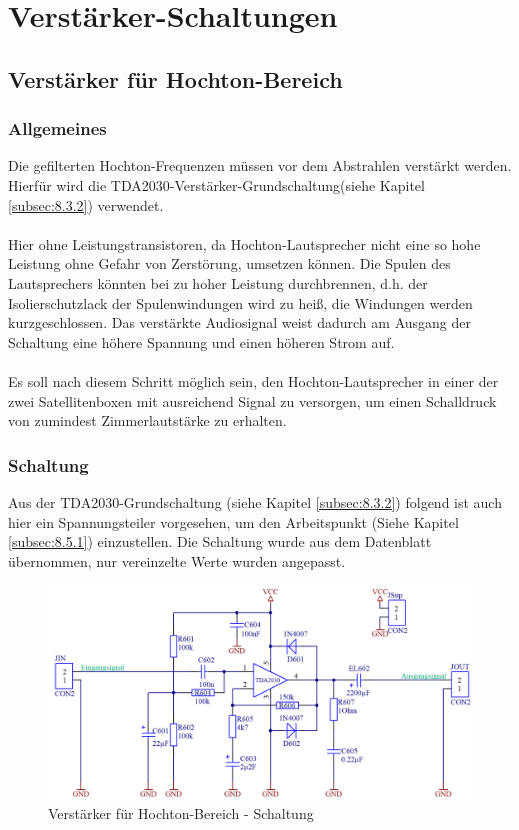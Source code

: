 
\section{Verstärker-Schaltungen}


\subsection{Verstärker für Hochton-Bereich}\label{subsec:5.1}
\subsubsection{Allgemeines}\label{subsec:5.1.1}
Die gefilterten Hochton-Frequenzen müssen vor dem Abstrahlen verstärkt werden.
Hierfür wird die TDA2030-Verstärker-Grundschaltung(siehe Kapitel \ref{subsec:8.3.2}) verwendet.
\\ \\
Hier ohne Leistungstransistoren, da Hochton-Lautsprecher nicht eine so hohe Leistung ohne Gefahr von Zerstörung, umsetzen können.
Die Spulen des Lautsprechers könnten bei zu hoher Leistung durchbrennen, d.h. der Isolierschutzlack der Spulenwindungen wird zu heiß, die Windungen werden kurzgeschlossen.
Das verstärkte Audiosignal weist dadurch am Ausgang der Schaltung eine höhere Spannung und einen höheren Strom auf.
\\ \\
Es soll nach diesem Schritt möglich sein, den Hochton-Lautsprecher in einer der zwei Satellitenboxen mit ausreichend Signal zu versorgen, um einen Schalldruck von zumindest Zimmerlautstärke zu erhalten. 

\newpage
\subsubsection{Schaltung}\label{subsec:5.1.2}
Aus der TDA2030-Grundschaltung (siehe Kapitel \ref{subsec:8.3.2}) folgend ist auch hier ein Spannungsteiler vorgesehen, um den Arbeitspunkt (Siehe Kapitel \ref{subsec:8.5.1}) einzustellen.
Die Schaltung wurde aus dem Datenblatt übernommen, nur vereinzelte Werte wurden angepasst. 

\begin{figure} [H]
	\centering	
	\includegraphics[width=1\textwidth]{img/Print6/HTVerstaerker-Schem.PNG}
	\caption{Verstärker für Hochton-Bereich - Schaltung}
	\label {fig:5.1.2.1}
\end{figure}


